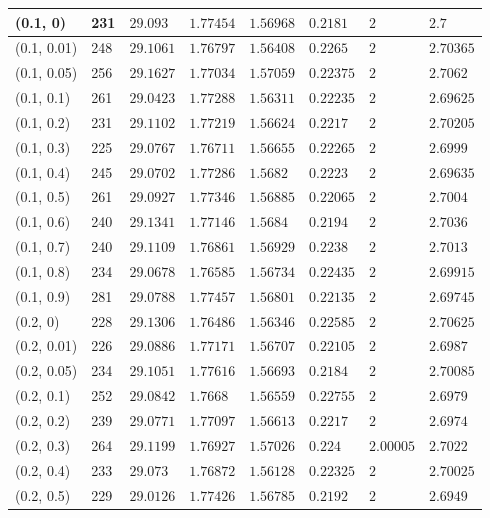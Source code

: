 \begin{center}
{\begin{longtable}{| l | p{} |  p{} | p{} | p{} | p{} | p{} | p{} |}
 (0.1, 0) & 231  & $29.093$ & $1.77454$ & $1.56968$ & $0.2181$ & $2$ & $2.7$ \\ \hline
 (0.1, 0.01) & 248  & $29.1061$ & $1.76797$ & $1.56408$ & $0.2265$ & $2$ & $2.70365$ \\ \hline
 (0.1, 0.05) & 256  & $29.1627$ & $1.77034$ & $1.57059$ & $0.22375$ & $2$ & $2.7062$ \\ \hline
 (0.1, 0.1) & 261  & $29.0423$ & $1.77288$ & $1.56311$ & $0.22235$ & $2$ & $2.69625$ \\ \hline
 (0.1, 0.2) & 231  & $29.1102$ & $1.77219$ & $1.56624$ & $0.2217$ & $2$ & $2.70205$ \\ \hline
 (0.1, 0.3) & 225  & $29.0767$ & $1.76711$ & $1.56655$ & $0.22265$ & $2$ & $2.6999$ \\ \hline
 (0.1, 0.4) & 245  & $29.0702$ & $1.77286$ & $1.5682$ & $0.2223$ & $2$ & $2.69635$ \\ \hline
 (0.1, 0.5) & 261  & $29.0927$ & $1.77346$ & $1.56885$ & $0.22065$ & $2$ & $2.7004$ \\ \hline
 (0.1, 0.6) & 240  & $29.1341$ & $1.77146$ & $1.5684$ & $0.2194$ & $2$ & $2.7036$ \\ \hline
 (0.1, 0.7) & 240  & $29.1109$ & $1.76861$ & $1.56929$ & $0.2238$ & $2$ & $2.7013$ \\ \hline
 (0.1, 0.8) & 234  & $29.0678$ & $1.76585$ & $1.56734$ & $0.22435$ & $2$ & $2.69915$ \\ \hline
 (0.1, 0.9) & 281  & $29.0788$ & $1.77457$ & $1.56801$ & $0.22135$ & $2$ & $2.69745$ \\ \hline
 (0.2, 0) & 228  & $29.1306$ & $1.76486$ & $1.56346$ & $0.22585$ & $2$ & $2.70625$ \\ \hline
 (0.2, 0.01) & 226  & $29.0886$ & $1.77171$ & $1.56707$ & $0.22105$ & $2$ & $2.6987$ \\ \hline
 (0.2, 0.05) & 234  & $29.1051$ & $1.77616$ & $1.56693$ & $0.2184$ & $2$ & $2.70085$ \\ \hline
 (0.2, 0.1) & 252  & $29.0842$ & $1.7668$ & $1.56559$ & $0.22755$ & $2$ & $2.6979$ \\ \hline
 (0.2, 0.2) & 239  & $29.0771$ & $1.77097$ & $1.56613$ & $0.2217$ & $2$ & $2.6974$ \\ \hline
 (0.2, 0.3) & 264  & $29.1199$ & $1.76927$ & $1.57026$ & $0.224$ & $2.00005$ & $2.7022$ \\ \hline
 (0.2, 0.4) & 233  & $29.073$ & $1.76872$ & $1.56128$ & $0.22325$ & $2$ & $2.70025$ \\ \hline
 (0.2, 0.5) & 229  & $29.0126$ & $1.77426$ & $1.56785$ & $0.2192$ & $2$ & $2.6949$ \\ \hline

\end{longtable}}
\end{center}
